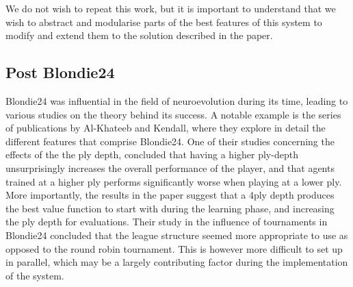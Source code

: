 \documentclass[12pt,a4paper]{article}
\begin{document}
        We do not wish to repeat this work, but it is important to understand that we wish to abstract and modularise parts of the best features of this system to modify and extend them to the solution described in the paper.

    \subsection{Post Blondie24}

        Blondie24 was influential in the field of neuroevolution during its time, leading to various studies on the theory behind its success. A notable example is the series of publications by Al-Khateeb and Kendall, where they explore in detail the different features that comprise Blondie24. One of their studies concerning the effects of the the ply depth, concluded that having a higher ply-depth unsurprisingly increases the overall performance of the player, and that agents trained at a higher ply performs significantly worse when playing at a lower ply. More importantly, the results in the paper suggest that a 4ply depth produces the best value function to start with during the learning phase, and increasing the ply depth for evaluations. \cite{al-khateeb_effect_2012} Their study in the influence of tournaments in Blondie24 concluded that the league structure seemed more appropriate to use as opposed to the round robin tournament. \cite{al-khateeb_introducing_2009} This is however more difficult to set up in parallel, which may be a largely contributing factor during the implementation of the system.
        

        
\end{document}

